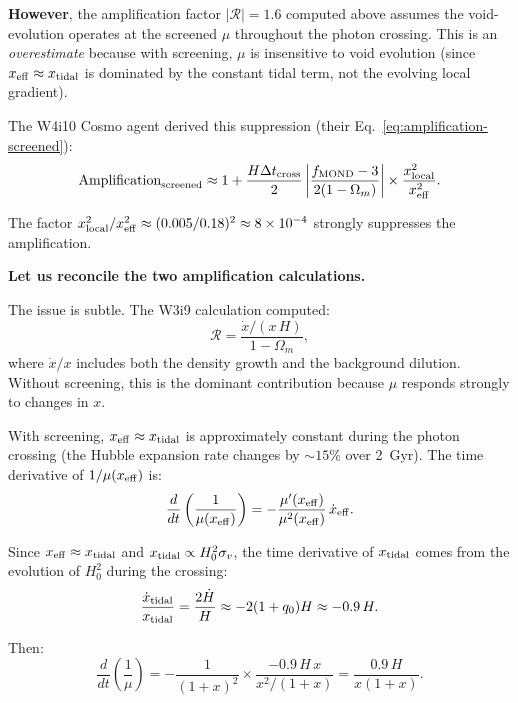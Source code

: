 \documentclass[11pt,a4paper]{article}
\newcommand{\ee}[1]{\times 10^{#1}}
\newcommand{\mufd}{\mu}
\newcommand{\Omm}{\Omega_m}
\begin{document}
\textbf{However}, the amplification factor $|\mathcal{R}| = 1.6$
computed above assumes the void-evolution operates at the screened
$\mufd$ throughout the photon crossing. This is an \emph{overestimate}
because with screening, $\mufd$ is insensitive to void evolution
(since $x_{\rm eff} \approx x_{\rm tidal}$ is dominated by the
constant tidal term, not the evolving local gradient).

The W4i10 Cosmo agent derived this suppression (their
Eq.~\eqref{eq:amplification-screened}):
\begin{equation}
\text{Amplification}_{\rm screened}
\approx 1 + \frac{H\Delta t_{\rm cross}}{2}
\left|\frac{f_{\rm MOND} - 3}{2(1-\Omm)}\right|
\times\frac{x_{\rm local}^2}{x_{\rm eff}^2}.
\label{eq:amp-suppressed}
\end{equation}

The factor $x_{\rm local}^2/x_{\rm eff}^2 \approx (0.005/0.18)^2
\approx 8\ee{-4}$ strongly suppresses the amplification.

\textbf{Let us reconcile the two amplification calculations.}

The issue is subtle. The W3i9 calculation computed:
\begin{equation}
\mathcal{R} = \frac{\dot{x}/(x\,H)}{1 - \Omm},
\end{equation}
where $\dot{x}/x$ includes both the density growth and the
background dilution. Without screening, this is the dominant
contribution because $\mufd$ responds strongly to changes in $x$.

With screening, $x_{\rm eff} \approx x_{\rm tidal}$ is approximately
constant during the photon crossing (the Hubble expansion rate
changes by $\sim 15\%$ over 2~Gyr). The time derivative of
$1/\mufd(x_{\rm eff})$ is:
\begin{equation}
\frac{d}{dt}\left(\frac{1}{\mufd(x_{\rm eff})}\right)
= -\frac{\mufd'(x_{\rm eff})}{\mufd^2(x_{\rm eff})}\,\dot{x}_{\rm eff}.
\end{equation}

Since $x_{\rm eff} \approx x_{\rm tidal}$ and $x_{\rm tidal}
\propto H_0^2\sigma_v$, the time derivative of $x_{\rm tidal}$ comes
from the evolution of $H_0^2$ during the crossing:
\begin{equation}
\frac{\dot{x}_{\rm tidal}}{x_{\rm tidal}}
= \frac{2\dot{H}}{H} \approx -2(1+q_0)H
\approx -0.9\,H.
\end{equation}

Then:
\begin{equation}
\frac{d}{dt}\left(\frac{1}{\mufd}\right)
= -\frac{1}{(1+x)^2}\times\frac{-0.9\,H\,x}{x^2/(1+x)}
= \frac{0.9\,H}{x(1+x)}.
\end{equation}
\end{document}
